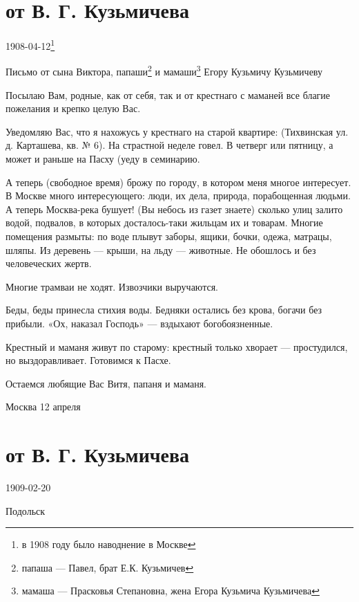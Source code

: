 \documentclass[]{memoir}
\begin{document}
\section{от В. Г. Кузьмичева}
{1908-04-12\footnote{в 1908 году было наводнение в Москве}}

Письмо от сына Виктора, папаши\footnote{папаша — Павел, брат Е.К. Кузьмичев} и мамаши\footnote{мамаша — Прасковья Степановна, жена Егора Кузьмича Кузьмичева} Егору Кузьмичу Кузьмичеву



Посылаю Вам, родные, как от себя, так и от крестнаго с маманей все благие пожелания и крепко целую Вас.

Уведомляю Вас, что я нахожусь у крестнаго на старой квартире: (Тихвинская ул. д. Карташева, кв. № 6). На страстной неделе говел. В четверг или пятницу, а может и раньше на  Пасху (уеду в семинарию. 

А теперь (свободное время) брожу по городу, в котором меня многое интересует. В Москве много интересующего: люди, их дела, природа, порабощенная людьми. А теперь Москва-река бушует! (Вы небось из газет знаете) сколько улиц залито водой, подвалов, в которых  досталось-таки жильцам их и товарам. Многие помещения размыты: по воде плывут заборы, ящики, бочки, одежа, матрацы, шляпы. Из деревень — крыши, на льду — животные. Не обошлось и без человеческих жертв. 

Многие трамваи не ходят. Извозчики выручаются. 

Беды, беды принесла стихия воды. Бедняки остались без крова, богачи без прибыли. 
«Ох, наказал Господь» — вздыхают богобоязненные.

Крестный и маманя живут по старому: крестный только хворает — простудился, но выздоравливает. Готовимся к Пасхе. 

Остаемся любящие Вас Витя, папаня и маманя.

Москва 12 апреля 


\section{от В. Г. Кузьмичева}
{1909-02-20}


Подольск%
\end{document}
